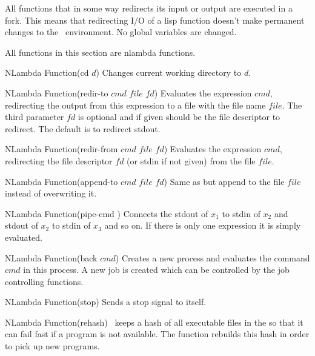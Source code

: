 All functions that in some way redirects its input or output are
executed in a fork.  This means that redirecting I/O of a lisp
function doesn't make permanent changes to the \lips\ environment.  No
global variables are changed.

All functions in this section are nlambda functions.

\begin{defun}{NLambda Function}{(cd $d$)}
  Changes current working directory to $d$.
\end{defun}


\begin{defun}{NLambda Function}{(redir-to $cmd$ $file$ $fd$)}
  Evaluates the expression $cmd$, redirecting the output from this
  expression to a file with the file name $file$. The third parameter
  $fd$ is optional and if given should be the file descriptor to
  redirect. The default is to redirect stdout.
\end{defun}

\begin{defun}{NLambda Function}{(redir-from $cmd$ $file$ $fd$)}
  Evaluates the expression $cmd$, redirecting the file descriptor $fd$
  (or stdin if not given) from the file $file$.
\end{defun}

\begin{defun}{NLambda Function}{(append-to $cmd$ $file$ $fd$)}
  Same as  but append to the file $file$ instead of
  overwriting it.
\end{defun}

\begin{defun}{NLambda Function}{(pipe-cmd \xargs)}
  Connects the stdout of $x_{1}$ to stdin of $x_{2}$ and stdout of
  $x_{2}$ to stdin of $x_{3}$ and so on. If there is only one
  expression it is simply evaluated.
\end{defun}

\begin{defun}{NLambda Function}{(back $cmd$)}
  Creates a new process and evaluates the command $cmd$ in this
  process. A new job is created which can be controlled by the job
  controlling functions.
\end{defun}

\begin{defun}{NLambda Function}{(stop)}
  Sends a stop signal to itself.
\end{defun}

\begin{defun}{NLambda Function}{(rehash)}
  \lips\ keeps a hash of all executable files in the  so
  that it can fail fast if a program is not available. The
   function rebuilds this hash in order to pick up new
  programs.
\end{defun}

